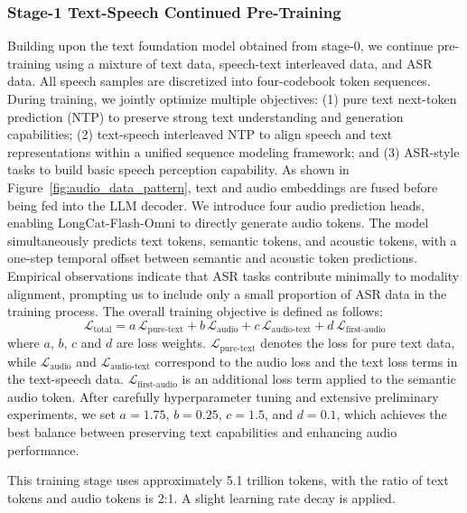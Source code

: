 \documentclass{article}
\newcommand{\longcat}{LongCat-Flash-Omni\xspace}
\begin{document}
\subsubsection{Stage-1 Text-Speech Continued Pre-Training}
\label{subsec:stage-1}

Building upon the text foundation model obtained from stage-0, we continue pre-training using a mixture of text data, speech-text interleaved data, and ASR data. All speech samples are discretized into four-codebook token sequences. During training, we jointly optimize multiple objectives: (1) pure text next-token prediction (NTP) to preserve strong text understanding and generation capabilities; (2) text-speech interleaved NTP to align speech and text representations within a unified sequence modeling framework; and (3) ASR-style tasks to build basic speech perception capability.
As shown in Figure~\ref{fig:audio_data_pattern}, text and audio embeddings are fused before being fed into the LLM decoder. We introduce four audio prediction heads, enabling \longcat to directly generate audio tokens. The model simultaneously predicts text tokens, semantic tokens, and acoustic tokens, with a one-step temporal offset between semantic and acoustic token predictions. Empirical observations indicate that ASR tasks contribute minimally to modality alignment, prompting us to include only a small proportion of ASR data in the training process.
The overall training objective is defined as follows:
\[
\mathcal{L}_{\text{total}} 
= a\, \mathcal{L}_{\text{pure-text}} 
+ b\, \mathcal{L}_{\text{audio}} 
+ c\, \mathcal{L}_{\text{audio-text}} 
+ d\, \mathcal{L}_{\text{first-audio}}
\]
where $a$, $b$, $c$ and $d$ are loss weights. $\mathcal{L}_\text{pure-text}$ denotes the loss for pure text data, while $\mathcal{L}_\text{audio}$ and $\mathcal{L}_\text{audio-text}$ correspond to the audio loss and the text loss terms in the text-speech data. $\mathcal{L}_\text{first-audio}$ is an additional loss term applied to the semantic audio token. After carefully hyperparameter tuning and extensive preliminary experiments, we set \(a = 1.75\), \(b = 0.25\), \(c = 1.5\), and \(d = 0.1\), which achieves the best balance between preserving text capabilities and enhancing audio performance.

This training stage uses approximately 5.1 trillion tokens, 
with the ratio of text tokens and audio tokens is 2:1. A slight learning rate decay is applied.
\end{document}
